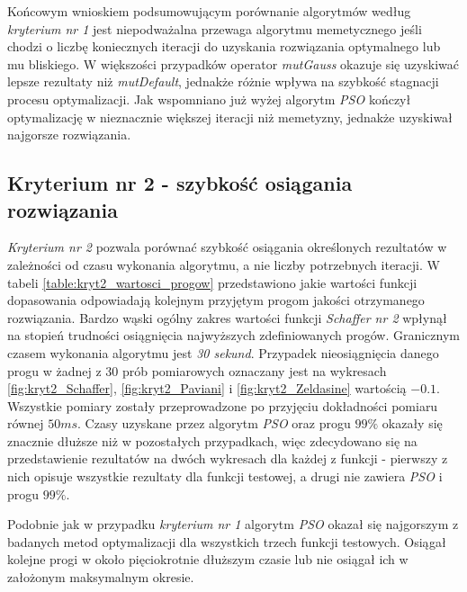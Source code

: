 \FloatBarrier

\par
Końcowym wnioskiem podsumowującym porównanie algorytmów według \emph{kryterium nr 1} jest niepodważalna przewaga algorytmu memetycznego jeśli chodzi o liczbę koniecznych iteracji do uzyskania rozwiązania optymalnego lub mu bliskiego. W większości przypadków operator \emph{mutGauss} okazuje się uzyskiwać lepsze rezultaty niż \emph{mutDefault}, jednakże różnie wpływa na szybkość stagnacji procesu optymalizacji. Jak wspomniano już wyżej algorytm \emph{PSO} kończył optymalizację w nieznacznie większej iteracji niż memetyzny, jednakże uzyskiwał najgorsze rozwiązania.


\subsection{Kryterium nr 2 - szybkość osiągania rozwiązania}
%

\par
\emph{Kryterium nr 2} pozwala porównać szybkość osiągania określonych rezultatów w zależności od czasu wykonania algorytmu, a nie liczby potrzebnych iteracji. W tabeli \ref{table:kryt2_wartosci_progow} przedstawiono jakie wartości funkcji dopasowania odpowiadają kolejnym przyjętym progom jakości otrzymanego rozwiązania. Bardzo wąski ogólny zakres wartości funkcji \emph{Schaffer nr 2} wpłynął na stopień trudności osiągnięcia najwyższych zdefiniowanych progów. Granicznym czasem wykonania algorytmu jest \emph{30 sekund}. Przypadek nieosiągnięcia danego progu w żadnej z 30 prób pomiarowych oznaczany jest na wykresach \ref{fig:kryt2_Schaffer}, \ref{fig:kryt2_Paviani} i \ref{fig:kryt2_Zeldasine} wartością $-0.1$. Wszystkie pomiary zostały przeprowadzone po przyjęciu dokładności pomiaru równej $50 ms$. Czasy uzyskane przez algorytm \emph{PSO} oraz progu $99\%$ okazały się znacznie dłuższe niż w pozostałych przypadkach, więc zdecydowano się na przedstawienie rezultatów na dwóch wykresach dla każdej z funkcji - pierwszy z nich opisuje wszystkie rezultaty dla funkcji testowej, a drugi nie zawiera \emph{PSO} i progu $99\%$.
\par
Podobnie jak w przypadku \emph{kryterium nr 1} algorytm \emph{PSO} okazał się najgorszym z badanych metod optymalizacji dla wszystkich trzech funkcji testowych. Osiągał kolejne progi w około pięciokrotnie dłuższym czasie lub nie osiągał ich w założonym maksymalnym okresie. 



